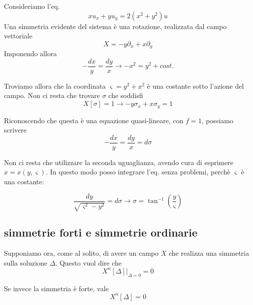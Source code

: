 \documentclass{report}
\begin{document}
\begin{example}
    Consideriamo l'eq. 
    \begin{equation}
        xu_x + yu_y = 2(x^2 + y^2)u
    \end{equation}
    Una simmetria evidente del sistema è una rotazione, realizzata dal campo vettoriale 
    \begin{equation}
        X = -y\partial_x + x\partial_y 
    \end{equation}
    Imponendo allora 
    \begin{equation}
        -\frac{dx}{y} = \frac{dy}{x} \rightarrow -x^2 = y^2 + cost. 
    \end{equation}

    Troviamo allora che la coordinata $\varsigma = y^2 + x^2$ è una costante sotto l'azione del campo. Non ci resta che trovare $\sigma$ che soddisfi 
    \begin{equation}
        X[\sigma] = 1 \rightarrow -y\sigma_x + x\sigma_y = 1
    \end{equation}

    Riconoscendo che questa è una equazione quasi-lineare, con $f=1$, possiamo scrivere 
    \begin{equation}
        -\frac{dx}{y} = \frac{dy}{x} = d\sigma
    \end{equation}

    Non ci resta che utilizzare la seconda uguaglianza, avendo cura di esprimere $x = x(y, \varsigma)$. In questo modo posso integrare l'eq. senza problemi, perchè $\varsigma$ è una costante: 

    \begin{equation}
        \frac{dy}{\sqrt{\varsigma^2 - y^2}} = d\sigma \rightarrow \sigma = \tan^{-1}\left(\frac{y}{\varsigma} \right)
    \end{equation}
\end{example}

\subsection{simmetrie forti e simmetrie ordinarie}

Supponiamo ora, come al solito, di avere un campo $X$ che realizza una simmetria sulla soluzione $\Delta$. Questo vuol dire che 
\begin{equation}
X^n[\Delta]\biggr|_{\Delta=0} = 0
\end{equation}

Se invece la simmetria è forte, vale 
\begin{equation}
    X^n[\Delta] = 0
\end{equation}
\end{document}
